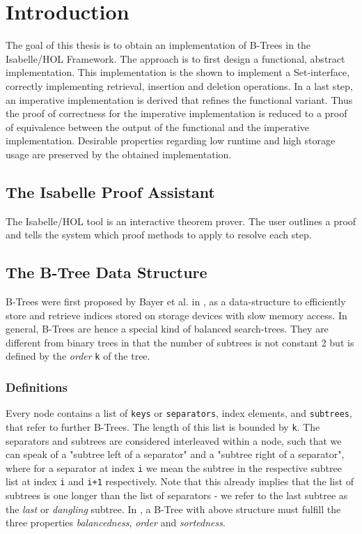 
\chapter{Introduction}\label{chapter:introduction}

The goal of this thesis is to obtain an implementation of B-Trees in the Isabelle/HOL Framework.
The approach is to first design a functional, abstract implementation.
This implementation is the shown to implement a Set-interface,
correctly implementing retrieval, insertion and deletion operations.
In a last step, an imperative implementation is derived that
refines the functional variant.
Thus the proof of correctness for the imperative implementation
is reduced to a proof of equivalence between the output of the
functional and the imperative implementation.
Desirable properties regarding low runtime and high storage usage
are preserved by the obtained implementation.

\section{The Isabelle Proof Assistant}

The Isabelle/HOL tool is an interactive theorem prover.
The user outlines a proof and tells the system which proof methods to apply to
resolve each step.

\section{The B-Tree Data Structure}

B-Trees were first proposed by Bayer et al. in \parencite{DBLP:journals/acta/BayerM72},
as a data-structure to efficiently store and retrieve indices stored on storage devices
with slow memory access.
In general, B-Trees are hence a special kind of balanced search-trees.
They are different from binary trees in that the number of subtrees is not constant 2
but is defined by the \textit{order} \texttt{k} of the tree.

\subsection{Definitions}

Every node contains a list of \texttt{keys} or \texttt{separators}, index elements, and \texttt{subtrees},
that refer to further B-Trees.
The length of this list is bounded by \texttt{k}.
The separators and subtrees are considered interleaved within a node,
such that we can speak of a "subtree left of a separator" and a "subtree right of a separator",
where for a separator at index \texttt{i} we mean the subtree in the respective
subtree list at index \texttt{i} and \texttt{i+1} respectively.
Note that this already implies that the list of subtrees is one
longer than the list of separators - we refer to the last subtree as the \textit{last} or
\textit{dangling} subtree.
In \parencite{DBLP:journals/acta/BayerM72},
a B-Tree with above structure must fulfill the three properties
\textit{balancedness}, \textit{order} and \textit{sortedness}.


